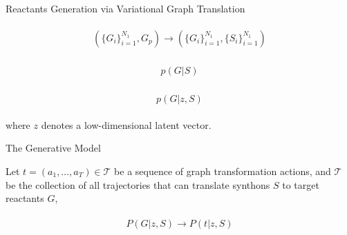 \documentclass{beamer}		%
\begin{document}
\begin{frame}{Reactants Generation via Variational Graph Translation}

\begin{eqnarray*}
\begin{aligned}
(\{G_i\}_{i=1}^{N_1}, G_p) \to (\{G_i\}_{i=1}^{N_1}, \{S_i\}_{i=1}^{N_1})
\end{aligned}    
\end{eqnarray*}

\pause

\begin{eqnarray*}
\begin{aligned}
p(G|S)
\end{aligned}    
\end{eqnarray*}

\pause

\begin{eqnarray*}
\begin{aligned}
p(G|z, S)
\end{aligned}    
\end{eqnarray*}

where $z$ denotes a low-dimensional latent vector.


\end{frame}









\begin{frame}{The Generative Model}

Let $t=(a_1,\ldots,a_T) \in \mathcal{T}$ be a sequence of graph transformation actions, and $\mathcal{T}$ be the collection of all trajectories that can translate synthons $S$ to target reactants $G$,

\begin{eqnarray*}
\begin{aligned}
P(G|z, S) \to  P(t|z, S)
\end{aligned}    
\end{eqnarray*}


\end{frame}
\end{document}
